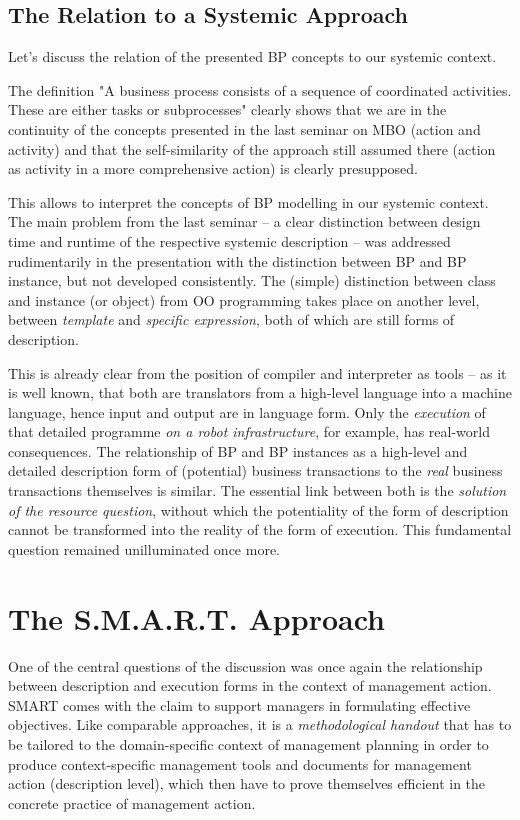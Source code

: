 \documentclass[11pt,a4paper]{article}
\begin{document}
\subsection{The Relation to a Systemic Approach} 

Let's discuss the relation of the presented BP concepts to our systemic
context.

The definition "A business process consists of a sequence of coordinated
activities. These are either tasks or subprocesses" clearly shows that we are
in the continuity of the concepts presented in the last seminar on MBO (action
and activity) and that the self-similarity of the approach still assumed there
(action as activity in a more comprehensive action) is clearly presupposed.

This allows to interpret the concepts of BP modelling in our systemic context.
The main problem from the last seminar -- a clear distinction between design
time and runtime of the respective systemic description -- was addressed
rudimentarily in the presentation with the distinction between BP and BP
instance, but not developed consistently. The (simple) distinction between
class and instance (or object) from OO programming takes place on another
level, between \emph{template} and \emph{specific expression}, both of which
are still forms of description.

This is already clear from the position of compiler and interpreter as tools
-- as it is well known, that both are translators from a high-level language
into a machine language, hence input and output are in language form. Only the
\emph{execution} of that detailed programme \emph{on a robot infrastructure},
for example, has real-world consequences. The relationship of BP and BP
instances as a high-level and detailed description form of (potential)
business transactions to the \emph{real} business transactions themselves is
similar. The essential link between both is the \emph{solution of the resource
  question}, without which the potentiality of the form of description cannot
be transformed into the reality of the form of execution. This fundamental
question remained unilluminated once more.
\enlargethispage{1em}

\section{The S.M.A.R.T. Approach}

One of the central questions of the discussion was once again the relationship
between description and execution forms in the context of management action.
SMART comes with the claim to support managers in formulating effective
objectives. Like comparable approaches, it is a \emph{methodological handout}
that has to be tailored to the domain-specific context of management planning
in order to produce context-specific management tools and documents for
management action (description level), which then have to prove themselves
efficient in the concrete practice of management action.
\end{document}
